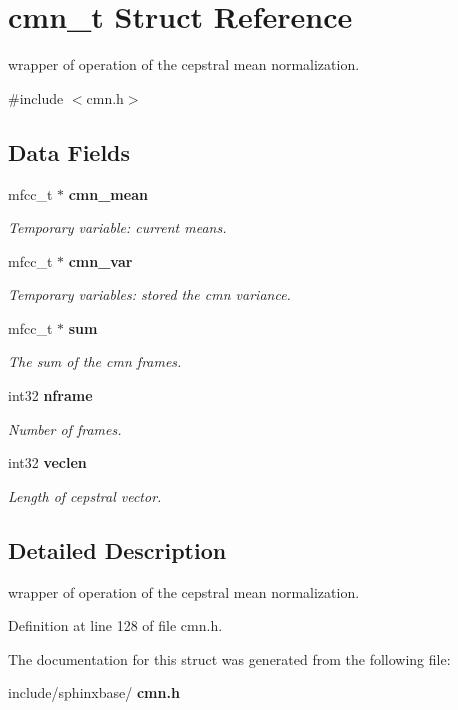 \section{cmn\+\_\+t Struct Reference}
\label{structcmn__t}


wrapper of operation of the cepstral mean normalization.  




{\ttfamily \#include $<$cmn.\+h$>$}

\subsection*{Data Fields}
\begin{DoxyCompactItemize}
\item 
\mbox{\label{structcmn__t_aef0faa6cd93f1d9cf12659c5980aefd2}} 
mfcc\+\_\+t $\ast$ \textbf{ cmn\+\_\+mean}
\begin{DoxyCompactList}\small\item\em Temporary variable\+: current means. \end{DoxyCompactList}\item 
\mbox{\label{structcmn__t_a72813f1c9423186f5bd66ecb39099eb5}} 
mfcc\+\_\+t $\ast$ \textbf{ cmn\+\_\+var}
\begin{DoxyCompactList}\small\item\em Temporary variables\+: stored the cmn variance. \end{DoxyCompactList}\item 
\mbox{\label{structcmn__t_adb70819b1ca822d5a4ee6dc94b3b48e7}} 
mfcc\+\_\+t $\ast$ \textbf{ sum}
\begin{DoxyCompactList}\small\item\em The sum of the cmn frames. \end{DoxyCompactList}\item 
\mbox{\label{structcmn__t_a456cc3313e93fa3057b658fef64a0c53}} 
int32 \textbf{ nframe}
\begin{DoxyCompactList}\small\item\em Number of frames. \end{DoxyCompactList}\item 
\mbox{\label{structcmn__t_a10472e0ad9272f764b512ade43f37d69}} 
int32 \textbf{ veclen}
\begin{DoxyCompactList}\small\item\em Length of cepstral vector. \end{DoxyCompactList}\end{DoxyCompactItemize}


\subsection{Detailed Description}
wrapper of operation of the cepstral mean normalization. 

Definition at line 128 of file cmn.\+h.



The documentation for this struct was generated from the following file\+:\begin{DoxyCompactItemize}
\item 
include/sphinxbase/\textbf{ cmn.\+h}\end{DoxyCompactItemize}
